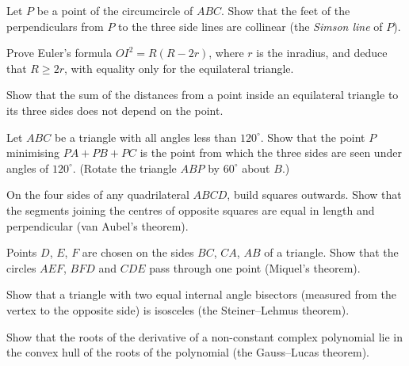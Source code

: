 \begin{exercise}[$\star\star$]\label{ex:simson}
Let $P$ be a point of the circumcircle of $ABC$. Show that the feet of the perpendiculars from $P$ to the three side lines are collinear
(the \emph{Simson line} of $P$).
\end{exercise}

\begin{exercise}[$\star\star$]\label{ex:eulerOI}
Prove Euler's formula $OI^2=R(R-2r)$, where $r$ is the inradius, and deduce that $R\ge2r$, with equality only for the equilateral triangle.
\end{exercise}

\begin{exercise}[$\star$]\label{ex:viviani}
Show that the sum of the distances from a point inside an equilateral triangle to its three sides does not depend on the point.
\end{exercise}

\begin{exercise}[$\star\star$]\label{ex:fermatpoint}
Let $ABC$ be a triangle with all angles less than $120^\circ$. Show that the point $P$ minimising $PA+PB+PC$ is the point from which the
three sides are seen under angles of $120^\circ$. (Rotate the triangle $ABP$ by $60^\circ$ about $B$.)
\end{exercise}

\begin{exercise}[$\star\star$]\label{ex:vanaubel}
On the four sides of any quadrilateral $ABCD$, build squares outwards. Show that the segments joining the centres of opposite squares
are equal in length and perpendicular (van Aubel's theorem).
\end{exercise}

\begin{exercise}[$\star\star$]\label{ex:miquel}
Points $D$, $E$, $F$ are chosen on the sides $BC$, $CA$, $AB$ of a triangle. Show that the circles $AEF$, $BFD$ and $CDE$ pass through
one point (Miquel's theorem).
\end{exercise}

\begin{exercise}[$\star\star\star$]\label{ex:steinerlehmus}
Show that a triangle with two equal internal angle bisectors (measured from the vertex to the opposite side) is isosceles (the
Steiner--Lehmus theorem).
\end{exercise}

\begin{exercise}[$\star\star$]\label{ex:gausslucas}
Show that the roots of the derivative of a non-constant complex polynomial lie in the convex hull of the roots of the polynomial (the
Gauss--Lucas theorem).
\end{exercise}

